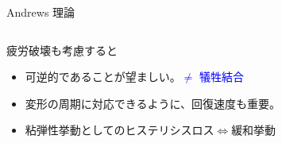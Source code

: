 \documentclass[12pt, dvipdfmx]{beamer}
\begin{document}
\begin{frame}
\begin{exampleblock}{Andrews 理論}
\begin{columns}[T, onlytextwidth]
\begin{center}
					\end{center}
			\end{columns}
		\end{exampleblock}
		\vspace{-2mm}
		\begin{alertblock}{疲労破壊も考慮すると}
			\begin{itemize}
				\item \alert{可逆的}であることが望ましい。\textcolor{blue}{$\neq$ 犠牲結合}
				\item 変形の周期に対応できるように、\alert{回復速度}も重要。
				\item \alert{粘弾性挙動としてのヒステリシスロス$\Leftrightarrow$緩和挙動}
			\end{itemize}
		\end{alertblock}
\end{frame}
\end{document}
